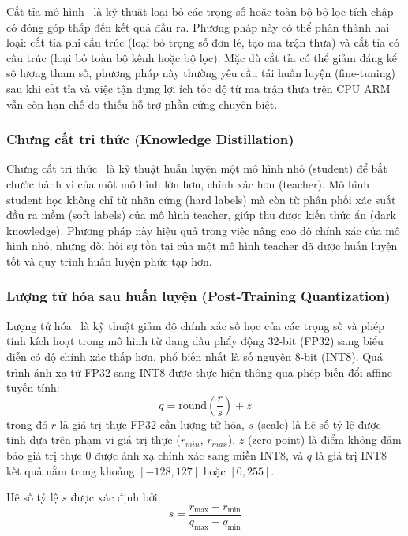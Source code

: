 \documentclass[conference]{IEEEtran}
\begin{document}
Cắt tỉa mô hình~\cite{han2015learning} là kỹ thuật loại bỏ các trọng số hoặc toàn bộ bộ lọc tích chập có đóng góp thấp đến kết quả đầu ra. Phương pháp này có thể phân thành hai loại: cắt tỉa phi cấu trúc (loại bỏ trọng số đơn lẻ, tạo ma trận thưa) và cắt tỉa có cấu trúc (loại bỏ toàn bộ kênh hoặc bộ lọc). Mặc dù cắt tỉa có thể giảm đáng kể số lượng tham số, phương pháp này thường yêu cầu tái huấn luyện (fine-tuning) sau khi cắt tỉa và việc tận dụng lợi ích tốc độ từ ma trận thưa trên CPU ARM vẫn còn hạn chế do thiếu hỗ trợ phần cứng chuyên biệt.

\subsubsection{Chưng cất tri thức (Knowledge Distillation)}

Chưng cất tri thức~\cite{hinton2015distilling} là kỹ thuật huấn luyện một mô hình nhỏ (student) để bắt chước hành vi của một mô hình lớn hơn, chính xác hơn (teacher). Mô hình student học không chỉ từ nhãn cứng (hard labels) mà còn từ phân phối xác suất đầu ra mềm (soft labels) của mô hình teacher, giúp thu được kiến thức ẩn (dark knowledge). Phương pháp này hiệu quả trong việc nâng cao độ chính xác của mô hình nhỏ, nhưng đòi hỏi sự tồn tại của một mô hình teacher đã được huấn luyện tốt và quy trình huấn luyện phức tạp hơn.

\subsubsection{Lượng tử hóa sau huấn luyện (Post-Training Quantization)}

Lượng tử hóa~\cite{jacob2018quantization} là kỹ thuật giảm độ chính xác số học của các trọng số và phép tính kích hoạt trong mô hình từ dạng dấu phẩy động 32-bit (FP32) sang biểu diễn có độ chính xác thấp hơn, phổ biến nhất là số nguyên 8-bit (INT8). Quá trình ánh xạ từ FP32 sang INT8 được thực hiện thông qua phép biến đổi affine tuyến tính:
\begin{equation}
q = \text{round}\left(\frac{r}{s}\right) + z
\end{equation}
trong đó $r$ là giá trị thực FP32 cần lượng tử hóa, $s$ (scale) là hệ số tỷ lệ được tính dựa trên phạm vi giá trị thực ($r_{min}$, $r_{max}$), $z$ (zero-point) là điểm không đảm bảo giá trị thực 0 được ánh xạ chính xác sang miền INT8, và $q$ là giá trị INT8 kết quả nằm trong khoảng $[-128, 127]$ hoặc $[0, 255]$.

Hệ số tỷ lệ $s$ được xác định bởi:
\begin{equation}
s = \frac{r_{\max} - r_{\min}}{q_{\max} - q_{\min}}
\end{equation}
\end{document}
